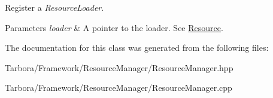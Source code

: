 Register a {\itshape Resource\+Loader}. 


\begin{DoxyParams}{Parameters}
{\em loader} & A pointer to the loader. See \hyperlink{classTarbora_1_1Resource}{Resource}. \\
\hline
\end{DoxyParams}


The documentation for this class was generated from the following files\+:\begin{DoxyCompactItemize}
\item 
Tarbora/\+Framework/\+Resource\+Manager/Resource\+Manager.\+hpp\item 
Tarbora/\+Framework/\+Resource\+Manager/Resource\+Manager.\+cpp\end{DoxyCompactItemize}
